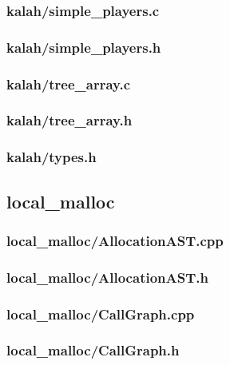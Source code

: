 \documentclass{article}
\begin{document}
\subsubsection*{kalah/simple\_players.c}


\subsubsection*{kalah/simple\_players.h}


\subsubsection*{kalah/tree\_array.c}


\subsubsection*{kalah/tree\_array.h}


\subsubsection*{kalah/types.h}


\subsection*{local\_malloc}
\subsubsection*{local\_malloc/AllocationAST.cpp}


\subsubsection*{local\_malloc/AllocationAST.h}


\subsubsection*{local\_malloc/CallGraph.cpp}


\subsubsection*{local\_malloc/CallGraph.h}

\end{document}
